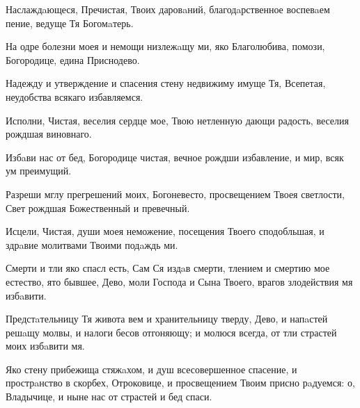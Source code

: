 \begin{mymulticols}
Наслаждaющеся, Пречистая, Твоих даровaний, благодaрственное воспевaем пение, ведуще Тя Богомaтерь.

\slava

На одре болезни моея и немощи низлежaщу ми, яко Благолюбива, помози, Богородице, едина Приснодево.

\inyne

Надежду и утверждение и спасения стену недвижиму имуще Тя, Всепетая, неудобства всякаго избавляемся.




Исполни, Чистая, веселия сердце мое, Твою нетленную дающи радость, веселия рождшая виновнаго.


Избaви нас от бед, Богородице чистая, вечное рождши избавление, и мир, всяк ум преимущий.

\slava

Разреши мглу прегрешений моих, Богоневесто, просвещением Твоея светлости, Свет рождшая Божественный и превечный.

\inyne

Исцели, Чистая, души моея неможение, посещения Твоего сподобльшая, и здрaвие молитвами Твоими подaждь ми.




Смерти и тли яко спасл есть, Сам Ся издaв смерти, тлением и смертию мое естество, ято бывшее, Дево, моли Господа и Сына Твоего, врагов злодействия мя избaвити.


Предстaтельницу Тя живота вем и хранительницу тверду, Дево, и напaстей решaщу молвы, и налоги бесов отгоняющу; и молюся всегда, от тли страстей моих избaвити мя.

\slava

Яко стену прибежища стяжaхом, и душ всесовершенное спасение, и прострaнство в скорбех, Отроковице, и просвещением Твоим присно рaдуемся: о, Владычице, и ныне нас от страстей и бед спаси.


\end{mymulticols}
